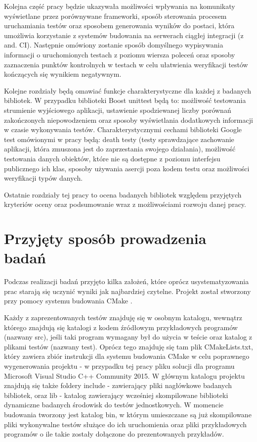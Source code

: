 \documentclass[12pt,a4paper,notitlepage]{report}
\begin{document}
Kolejna część pracy będzie ukazywała możliwości wpływania na komunikaty wyświetlane przez porównywane frameworki, sposób sterowania procesem uruchamiania testów oraz sposobem generowania wyników do postaci, która umożliwia korzystanie z systemów budowania na serwerach ciągłej integracji (z and. CI). Następnie omówiony zostanie sposób domyślnego wypisywania informacji o uruchomionych testach z poziomu wiersza poleceń oraz sposoby zaznaczenia punktów kontrolnych w testach w celu ułatwienia weryfikacji testów kończących się wynikiem negatywnym.

Kolejne rozdziały będą omawiać funkcje charakterystyczne dla każdej z badanych bibliotek. W przypadku biblioteki Boost unittest będą to: możliwość testowania strumienie wyjściowego aplikacji, ustawienie spodziewanej liczby porównań zakończonych niepowodzeniem oraz sposoby wyświetlania dodatkowych informacji w czasie wykonywania testów. Charakterystycznymi cechami biblioteki Google test omówionymi w pracy będą: death testy (testy sprawdzające zachowanie aplikacji, która zmuszona jest do zaprzestania swojego działania), możliwość testowania danych obiektów, które nie są dostępne z poziomu interfejsu publicznego ich klas, sposoby używania asercji poza kodem testu oraz możliwości weryfikacji typów danych.

Ostatnie rozdziały tej pracy to ocena badanych bibliotek względem przyjętych kryteriów oceny oraz podsumowanie wraz z możliwościami rozwoju danej pracy.

\section{Przyjęty sposób prowadzenia badań}

Podczas realizacji badań przyjęto kilka założeń, które oprócz usystematyzowania prac starają się uczynić wyniki jak najbardziej czytelne. Projekt został stworzony przy pomocy systemu budowania CMake \cite{cmake}.

Każdy z zaprezentowanych testów znajduję się w osobnym katalogu, wewnątrz którego znajdują się katalogi z kodem źródłowym przykładowych programów (nazwany src), jeśli taki program wymagany był do użycia w teście oraz katalog z plikami testów (nazwany test). Oprócz tego znajduję się tam plik CMakeLists.txt, który zawiera zbiór instrukcji dla systemu budowania CMake w celu poprawnego wygenerowania projektu - w przypadku tej pracy pliku solucji dla programu Microsoft Visual Studio C++ Community 2015. W głównym katalogu projektu znajdują się także foldery include - zawierający pliki nagłówkowe badanych bibliotek, oraz lib - katalog zawierający wcześniej skompilowane biblioteki dynamiczne badanych środowisk do testów jednostkowych. W momencie budowania tworzony jest katalog bin, w którym umieszczane są już skompilowane pliki wykonywalne testów służące do ich uruchomienia oraz pliki przykładowych programów o ile takie zostały dołączone do prezentowanych przykładów.
\end{document}
